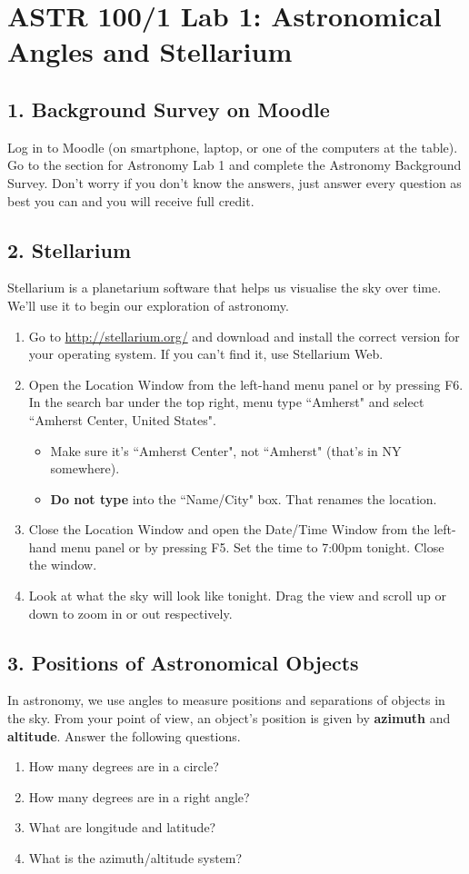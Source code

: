 \documentclass[main.tex]{subfiles}
\begin{document}
\section*{ASTR 100/1 Lab 1: Astronomical Angles and Stellarium}

\subsection*{1. Background Survey on Moodle}
Log in to Moodle (on smartphone, laptop, or one of the computers at the table). Go to the section for Astronomy Lab 1 and complete the Astronomy Background Survey. Don't worry if you don't know the answers, just answer every question as best you can and you will receive full credit.

\subsection*{2. Stellarium}
Stellarium is a planetarium software that helps us visualise the sky over time. We'll use it to begin our exploration of astronomy.
\begin{enumerate}
\item Go to \url{http://stellarium.org/} and download and install the correct version for your operating system. If you can't find it, use Stellarium Web.
\item Open the Location Window from the left-hand menu panel or by pressing F6. In the search bar under the top right, menu type ``Amherst" and select ``Amherst Center, United States".
	\begin{itemize}
	\item Make sure it's ``Amherst Center", not ``Amherst" (that's in NY somewhere).
	\item \textbf{Do not type} into the ``Name/City" box. That renames the location.
	\end{itemize}
\item Close the Location Window and open the Date/Time Window from the left-hand menu panel or by pressing F5. Set the time to 7:00pm tonight. Close the window.
\item Look at what the sky will look like tonight. Drag the view and scroll up or down to zoom in or out respectively.
\end{enumerate}

\subsection*{3. Positions of Astronomical Objects}
In astronomy, we use angles to measure positions and separations of objects in the sky. From your point of view, an object's position is given by \textbf{azimuth} and \textbf{altitude}. Answer the following questions.
\begin{enumerate}
\item How many degrees are in a circle?
\item How many degrees are in a right angle?
\item What are longitude and latitude?
\item What is the azimuth/altitude system?
\end{enumerate}
\end{document}
